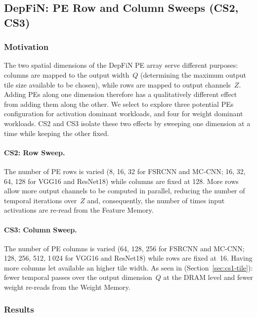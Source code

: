 \subsection{DepFiN: PE Row and Column Sweeps (CS2, CS3)}
\label{sec:cs2-cs3}

\subsubsection{Motivation}

The two spatial dimensions of the DepFiN PE array serve different
purposes: columns are mapped to the output width~$Q$ (determining the maximum output tile size available to be chosen), while rows are mapped to output channels~$Z$.
Adding PEs along one dimension therefore has a qualitatively different
effect from adding them along the other.
We select to explore three potential PEs configuration for activation dominant workloads, and four for weight dominant workloads.
CS2 and CS3 isolate these two effects by sweeping one dimension at a
time while keeping the other fixed.

\paragraph{CS2: Row Sweep.}
The number of PE rows is varied (8, 16, 32 for FSRCNN and MC-CNN;
16, 32, 64, 128 for VGG16 and ResNet18) while columns are fixed at
128.
More rows allow more output channels to be computed in parallel,
reducing the number of temporal iterations over~$Z$ and, consequently,
the number of times input activations are re-read from the Feature
Memory.

\paragraph{CS3: Column Sweep.}
The number of PE columns is varied (64, 128, 256 for FSRCNN and
MC-CNN; 128, 256, 512, 1\,024 for VGG16 and ResNet18) while rows are
fixed at~16.
Having more columns let available an higher tile width.
As seen in (Section~\ref{sec:cs1-tile}): fewer temporal passes over the output
dimension~$Q$ at the DRAM level and fewer weight re-reads from the
Weight Memory.


\subsubsection{Results}

